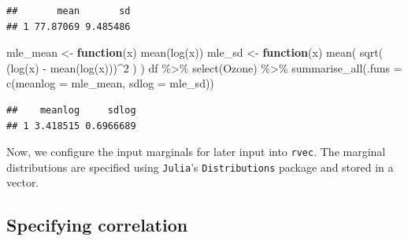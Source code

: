 \documentclass{article}
\newenvironment{Shaded}{\begin{snugshade}}{\end{snugshade}}
\newcommand{\AttributeTok}[1]{\textcolor[rgb]{0.77,0.63,0.00}{#1}}
\newcommand{\ControlFlowTok}[1]{\textcolor[rgb]{0.13,0.29,0.53}{\textbf{#1}}}
\newcommand{\DecValTok}[1]{\textcolor[rgb]{0.00,0.00,0.81}{#1}}
\newcommand{\FunctionTok}[1]{\textcolor[rgb]{0.00,0.00,0.00}{#1}}
\newcommand{\NormalTok}[1]{#1}
\newcommand{\OtherTok}[1]{\textcolor[rgb]{0.56,0.35,0.01}{#1}}
\newcommand{\SpecialCharTok}[1]{\textcolor[rgb]{0.00,0.00,0.00}{#1}}
\begin{document}
\begin{verbatim}
##       mean       sd
## 1 77.87069 9.485486
\end{verbatim}

\begin{Shaded}
\begin{Highlighting}[]
\NormalTok{mle\_mean }\OtherTok{\textless{}{-}} \ControlFlowTok{function}\NormalTok{(x) }\FunctionTok{mean}\NormalTok{(}\FunctionTok{log}\NormalTok{(x))}
\NormalTok{mle\_sd }\OtherTok{\textless{}{-}} \ControlFlowTok{function}\NormalTok{(x) }\FunctionTok{mean}\NormalTok{( }\FunctionTok{sqrt}\NormalTok{( (}\FunctionTok{log}\NormalTok{(x) }\SpecialCharTok{{-}} \FunctionTok{mean}\NormalTok{(}\FunctionTok{log}\NormalTok{(x)))}\SpecialCharTok{\^{}}\DecValTok{2}\NormalTok{ ) )}
\NormalTok{df }\SpecialCharTok{\%\textgreater{}\%} 
  \FunctionTok{select}\NormalTok{(Ozone) }\SpecialCharTok{\%\textgreater{}\%} 
  \FunctionTok{summarise\_all}\NormalTok{(}\AttributeTok{.funs =} \FunctionTok{c}\NormalTok{(}\AttributeTok{meanlog =}\NormalTok{ mle\_mean, }\AttributeTok{sdlog =}\NormalTok{ mle\_sd))}
\end{Highlighting}
\end{Shaded}

\begin{verbatim}
##    meanlog     sdlog
## 1 3.418515 0.6966689
\end{verbatim}

Now, we configure the input marginals for later input into
\texttt{rvec}. The marginal distributions are specified using
\texttt{Julia}'s \texttt{Distributions} package and stored in a vector.

\begin{Shaded}
\end{Shaded}

\hypertarget{specifying-correlation}{%
\subsection{Specifying correlation}\label{specifying-correlation}}
\end{document}
